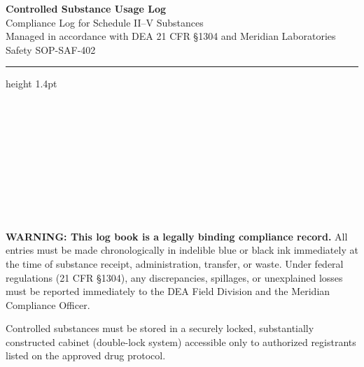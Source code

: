 \begin{center}
  {\color{brandnavy}\Huge\bfseries Controlled Substance Usage Log}\\[6pt]
  {\color{brandsteel}\Large Compliance Log for Schedule II--V Substances}\\[4pt]
  {\small\color{brandgray}Managed in accordance with DEA 21 CFR \S1304 and Meridian Laboratories Safety SOP-SAF-402}
\end{center}

\vspace{6pt}
{\color{brandborder}\hrule height 1.4pt}
\vspace{10pt}

\begin{minipage}[t]{0.485\linewidth}
\begin{fieldbox}
\\[3pt]
\\[3pt]
\\[3pt]
\\[3pt]
\end{fieldbox}
\end{minipage}\hfill
\begin{minipage}[t]{0.485\linewidth}
\begin{fieldbox}
\\[3pt]
\\[3pt]
\\[3pt]
\\[3pt]
\end{fieldbox}
\end{minipage}
\par

\vspace{10pt}

\begin{storagebox}
\textbf{WARNING: This log book is a legally binding compliance record.} All entries must be made chronologically in indelible blue or black ink immediately at the time of substance receipt, administration, transfer, or waste. Under federal regulations (21 CFR \S1304), any discrepancies, spillages, or unexplained losses must be reported immediately to the DEA Field Division and the Meridian Compliance Officer. 

Controlled substances must be stored in a securely locked, substantially constructed cabinet (double-lock system) accessible only to authorized registrants listed on the approved drug protocol.
\end{storagebox}

